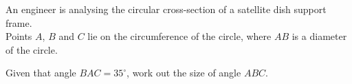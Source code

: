\begin{question}
\noindent An engineer is analysing the circular cross-section of a satellite dish support frame.\\
Points $A$, $B$ and $C$ lie on the circumference of the circle, where $AB$ is a diameter of the circle.\\ 

\begin{center}
\end{center}

\noindent Given that angle $BAC = 35^\circ$, work out the size of angle $ABC$.

\vspace{4cm}

\begin{flushright}
\end{flushright}
\end{question}
